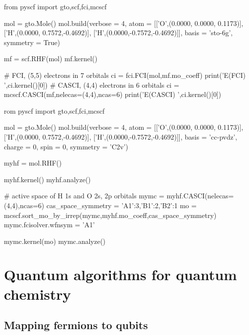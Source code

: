 \documentclass{article}
\begin{document}
\begin{python}
from pyscf import gto,scf,fci,mcscf
  
mol = gto.Mole()
mol.build(verbose  = 4,
          atom     = [['O',(0.0000, 0.0000, 0.1173)],
                      ['H',(0.0000, 0.7572,-0.4692)],
                      ['H',(0.0000,-0.7572,-0.4692)]],
          basis    = 'sto-6g',
          symmetry = True)

mf = scf.RHF(mol)
mf.kernel()

# FCI,   (5,5) electrons in 7 orbitals
ci = fci.FCI(mol,mf.mo_coeff)
print('E(FCI)   ',ci.kernel()[0])
# CASCI, (4,4) electrons in 6 orbitals
ci = mcscf.CASCI(mf,nelecas=(4,4),ncas=6)
print('E(CASCI) ',ci.kernel()[0])
\end{python}

\begin{python}
rom pyscf import gto,scf,fci,mcscf
  
mol = gto.Mole()
mol.build(verbose  = 4,
          atom     = [['O',(0.0000, 0.0000, 0.1173)],
                      ['H',(0.0000, 0.7572,-0.4692)],
                      ['H',(0.0000,-0.7572,-0.4692)]],
          basis    = 'cc-pvdz',
          charge   = 0,
          spin     = 0,
          symmetry = 'C2v')

myhf = mol.RHF()

myhf.kernel()
myhf.analyze()

# active space of H 1s and O 2s, 2p orbitals
mymc = myhf.CASCI(nelecas=(4,4),ncas=6)
cas_space_symmetry = {'A1':3,'B1':2,'B2':1}
mo = mcscf.sort_mo_by_irrep(mymc,myhf.mo_coeff,cas_space_symmetry)
mymc.fcisolver.wfnsym = 'A1'

mymc.kernel(mo)
mymc.analyze()
\end{python}

\pagebreak
\newpage

\section{Quantum algorithms for quantum chemistry}

\subsection{Mapping fermions to qubits}
\end{document}
